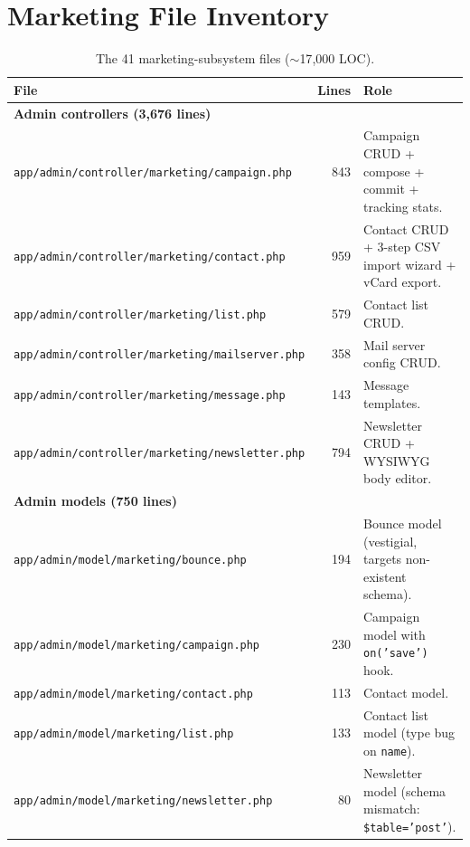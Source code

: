 \documentclass[11pt,a4paper]{article}
\begin{document}
\appendix

\section{Marketing File Inventory}\label{app:files}

\begin{table}[htbp]
\centering
\caption{The 41 marketing-subsystem files ($\sim$17{,}000 LOC).}\label{tab:file-inventory}
\footnotesize\sloppy
\begin{tabularx}{\columnwidth}{lrX}
\toprule
\textbf{File} & \textbf{Lines} & \textbf{Role} \\
\midrule
\multicolumn{3}{l}{\textbf{Admin controllers (3,676 lines)}} \\
\texttt{app/admin/controller/marketing/campaign.php}     & 843 & Campaign CRUD + compose + commit + tracking stats. \\
\texttt{app/admin/controller/marketing/contact.php}      & 959 & Contact CRUD + 3-step CSV import wizard + vCard export. \\
\texttt{app/admin/controller/marketing/list.php}         & 579 & Contact list CRUD. \\
\texttt{app/admin/controller/marketing/mailserver.php}   & 358 & Mail server config CRUD. \\
\texttt{app/admin/controller/marketing/message.php}      & 143 & Message templates. \\
\texttt{app/admin/controller/marketing/newsletter.php}   & 794 & Newsletter CRUD + WYSIWYG body editor. \\
\midrule
\multicolumn{3}{l}{\textbf{Admin models (750 lines)}} \\
\texttt{app/admin/model/marketing/bounce.php}            & 194 & Bounce model (vestigial, targets non-existent schema). \\
\texttt{app/admin/model/marketing/campaign.php}          & 230 & Campaign model with \texttt{on('save')} hook. \\
\texttt{app/admin/model/marketing/contact.php}           & 113 & Contact model. \\
\texttt{app/admin/model/marketing/list.php}              & 133 & Contact list model (type bug on \texttt{name}). \\
\texttt{app/admin/model/marketing/newsletter.php}        & 80  & Newsletter model (schema mismatch: \texttt{\$table='post'}). \\

\end{tabularx}
\end{table}
\end{document}
